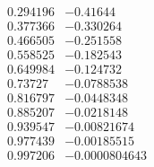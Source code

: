 \documentclass{watsonbook}
\begin{document}
\begin{aexercise}
{$$\begin{array}{cc}
      0.294196 & -0.41644 \\
      0.377366 & -0.330264 \\
      0.466505 & -0.251558 \\
      0.558525 & -0.182543 \\
      0.649984 & -0.124732 \\
      0.73727 & -0.0788538 \\
      0.816797 & -0.0448348 \\
      0.885207 & -0.0218148 \\
      0.939547 & -0.00821674 \\
      0.977439 & -0.00185515 \\
      0.997206 & -0.0000804643
    \end{array}
    $$}
\end{aexercise}
\end{document}
